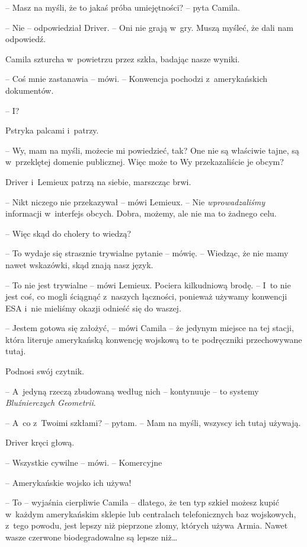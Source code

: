 \documentclass[oneside,polish,12pt,sfheadings]{mwbk}
\begin{document}
-- Masz na myśli, że to jakaś próba umiejętności? -- pyta Camila.

-- Nie -- odpowiedział Driver. -- Oni nie grają w~gry. Muszą myśleć, że
dali nam odpowiedź.

Camila szturcha w~powietrzu przez szkła, badając nasze wyniki.

-- Coś mnie zastanawia -- mówi. -- Konwencja pochodzi z~amerykańskich
dokumentów.

-- I?

Pstryka palcami i~patrzy.

-- Wy, mam na myśli, możecie mi powiedzieć, tak? One nie są właściwie
tajne, są w~przeklętej domenie publicznej. Więc może to Wy
przekazaliście je obcym?

Driver i~Lemieux patrzą na siebie, marszcząc brwi.

-- Nikt niczego nie przekazywał -- mówi Lemieux. -- Nie
\emph{wprowadzaliśmy} informacji w~interfejs obcych. Dobra, możemy, ale
nie ma to żadnego celu.

-- Więc skąd do cholery to wiedzą?

-- To wydaje się strasznie trywialne pytanie -- mówię. -- Wiedząc, że nie
mamy nawet wskazówki, skąd znają nasz język.

-- To nie jest trywialne -- mówi Lemieux. Pociera kilkudniową brodę. -- I~to nie jest coś, co mogli ściągnąć z~naszych łączności, ponieważ używamy
konwencji ESA i~nie mieliśmy okazji odnieść się do waszej.

-- Jestem gotowa się założyć, -- mówi Camila -- że jedynym miejsce na tej
stacji, która literuje amerykańską konwencję wojskową to te podręczniki
przechowywane tutaj.

Podnosi swój czytnik.

-- A~jedyną rzeczą zbudowaną według nich -- kontynuuje -- to systemy
\emph{Bluźnierczych Geometrii}.

-- A~co z~Twoimi szkłami? -- pytam. -- Mam na myśli, wszyscy ich tutaj
używają.

Driver kręci głową.

-- Wszystkie cywilne -- mówi. -- Komercyjne

-- Amerykańskie wojsko ich używa!

-- To -- wyjaśnia cierpliwie Camila -- dlatego, że ten typ szkieł możesz
kupić w~każdym amerykańskim sklepie lub centralach telefonicznych baz
wojskowych, z~tego powodu, jest lepszy niż pieprzone złomy, których
używa Armia. Nawet wasze czerwone biodegradowalne są lepsze niż\ldots
\end{document}
